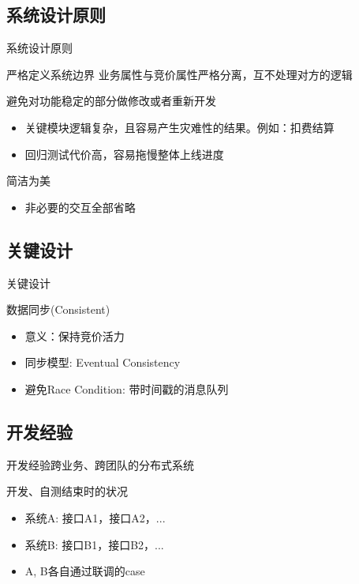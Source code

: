 \documentclass{beamer}
\begin{document}
\begin{CJK}{UTF8}{gbsn}
\subsection{系统设计原则}

\begin{frame}{系统设计原则}
  \begin{block}{严格定义系统边界}
    业务属性与竞价属性严格分离，互不处理对方的逻辑
    \pause
  \end{block}
  \begin{block}{避免对功能稳定的部分做修改或者重新开发}
    \begin{itemize}
      \item {
        关键模块逻辑复杂，且容易产生灾难性的结果。例如：扣费结算
      }
      \item {
        回归测试代价高，容易拖慢整体上线进度
      }
    \end{itemize}
    \pause
  \end{block}
  \begin{block}{简洁为美}
    \begin{itemize}
      \item {
        非必要的交互全部省略
      }
    \end{itemize}
  \end{block}
\end{frame}

\subsection{关键设计}

\begin{frame}{关键设计}
  \begin{block}{数据同步(Consistent)}
    \begin{itemize}
      \item {
        意义：保持竞价活力
      }
      \item {同步模型: Eventual Consistency}
      \item {避免Race Condition: 带时间戳的消息队列}
    \end{itemize}
  \end{block}
\end{frame}

\subsection{开发经验}

\begin{frame}{开发经验}{跨业务、跨团队的分布式系统}
  \begin{block}{开发、自测结束时的状况}
    \begin{itemize}
      \item {
        系统A: 接口A1，接口A2，...
      }
      \item {
        系统B: 接口B1，接口B2，...
      }
      \item {
        A, B各自通过联调的case
      }
    \end{itemize}
    \pause
  \end{block}


\end{frame}
\end{CJK}
\end{document}
